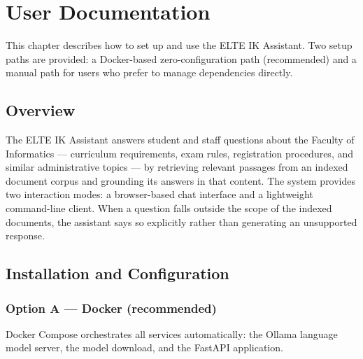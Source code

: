 \chapter{User Documentation}
\label{ch:user}

This chapter describes how to set up and use the ELTE IK Assistant.
Two setup paths are provided: a Docker-based zero-configuration path (recommended)
and a manual path for users who prefer to manage dependencies directly.

\section{Overview}
\label{sec:user-overview}

The ELTE IK Assistant answers student and staff questions about the Faculty of
Informatics — curriculum requirements, exam rules, registration procedures, and
similar administrative topics — by retrieving relevant passages from an indexed
document corpus and grounding its answers in that content.
The system provides two interaction modes: a browser-based chat interface and a
lightweight command-line client.
When a question falls outside the scope of the indexed documents, the assistant
says so explicitly rather than generating an unsupported response.

\section{Installation and Configuration}
\label{sec:user-install}

\subsection*{Option A — Docker (recommended)}

Docker Compose orchestrates all services automatically: the Ollama language model
server, the model download, and the FastAPI application.


